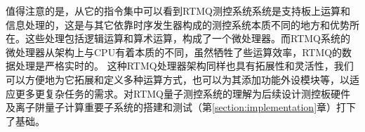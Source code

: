 值得注意的是，从它的指令集中可以看到RTMQ测控系统系统是支持板上运算和信息处理的，这是与其它依靠时序发生器构成的测控系统本质不同的地方和优势所在。这些处理包括逻辑运算和算术运算，构成了一个微处理器。而RTMQ系统的微处理器从架构上与CPU有着本质的不同，虽然牺牲了些运算效率，RTMQ的数据处理是严格实时的。
这种RTMQ处理器架构同样也具有拓展性和灵活性，我们可以方便地为它拓展和定义多种运算方式，也可以为其添加功能外设模块等，以适应更多更复杂任务的需求。对RTMQ量子测控系统的理解为后续设计测控板硬件及离子阱量子计算重要子系统的搭建和测试（第\ref{section:implementation}章）打下了基础。
